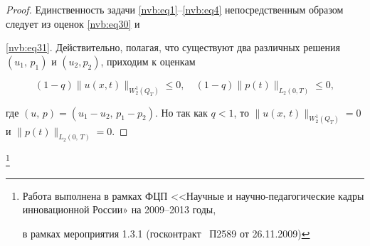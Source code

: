 \begin{proof}
Единственность задачи \eqref{nvb:eq1}--\eqref{nvb:eq4} непосредственным образом следует из оценок \eqref{nvb:eq30} и

\eqref{nvb:eq31}. Действительно, полагая, что существуют два различных решения $(u_1,\,p_1)$ и $(u_2,p_2)$, приходим к оценкам

$$

        (1-q)\|u(x,t)\|_{W_2^1(Q_T)}\leq 0,\quad 

        (1-q)\|p(t)\|_{L_2(0,T)}\leq 0,

$$

где $(u,\,p)= (u_1-u_2,\,p_1-p_2)$. Но так как $q<1$, то $\|u(x,\,t)\|_{W_2^1(Q_T)}=0$ и $\|p(t)\|_{L_2(0,\,T)}=0$.

\end{proof}



\thanks{Работа выполнена в рамках ФЦП <<Научные и научно-педагогические кадры инновационной России» на 2009--2013 годы,

в рамках мероприятия 1.3.1 {\rm (}госконтракт \No~П2589 от 26.11.2009{\rm)}}



